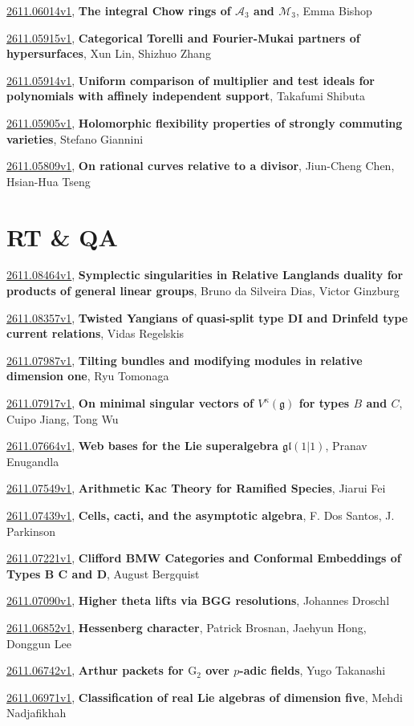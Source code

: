 \documentclass[9pt, a4paper]{article}
\theoremstyle{plain}
\theoremstyle{definition}
\theoremstyle{remark}
\newcommand{\arxiv}[3]{\href{https://arxiv.org/abs/#1}{#1}, \textbf{\textcolor{arxivblue}{#2}}, #3}
\begin{document}
\arxiv{2611.06014v1}{The integral Chow rings of $\mathcal A_3$ and $\mathcal M_3$}{Emma Bishop}

\arxiv{2611.05915v1}{Categorical Torelli and Fourier-Mukai partners of hypersurfaces}{Xun Lin, Shizhuo Zhang}

\arxiv{2611.05914v1}{Uniform comparison of multiplier and test ideals for polynomials with affinely independent support}{Takafumi Shibuta}

\arxiv{2611.05905v1}{Holomorphic flexibility properties of strongly commuting varieties}{Stefano Giannini}

\arxiv{2611.05809v1}{On rational curves relative to a divisor}{Jiun-Cheng Chen, Hsian-Hua Tseng}


\section{RT \& QA}
\arxiv{2611.08464v1}{Symplectic singularities in Relative Langlands duality for products of general linear groups}{Bruno da Silveira Dias, Victor Ginzburg}

\arxiv{2611.08357v1}{Twisted Yangians of quasi-split type DI and Drinfeld type current relations}{Vidas Regelskis}

\arxiv{2611.07987v1}{Tilting bundles and modifying modules in relative dimension one}{Ryu Tomonaga}

\arxiv{2611.07917v1}{On minimal singular vectors of $V^κ(\mathfrak{g})$ for types $B$ and $C$}{Cuipo Jiang, Tong Wu}

\arxiv{2611.07664v1}{Web bases for the Lie superalgebra $\mathfrak{gl}(1|1)$}{Pranav Enugandla}

\arxiv{2611.07549v1}{Arithmetic Kac Theory for Ramified Species}{Jiarui Fei}

\arxiv{2611.07439v1}{Cells, cacti, and the asymptotic algebra}{F. Dos Santos, J. Parkinson}

\arxiv{2611.07221v1}{Clifford BMW Categories and Conformal Embeddings of Types B C and D}{August Bergquist}

\arxiv{2611.07090v1}{Higher theta lifts via BGG resolutions}{Johannes Droschl}

\arxiv{2611.06852v1}{Hessenberg character}{Patrick Brosnan, Jaehyun Hong, Donggun Lee}

\arxiv{2611.06742v1}{Arthur packets for $\mathrm{G}_2$ over $p$-adic fields}{Yugo Takanashi}

\arxiv{2611.06971v1}{Classification of real Lie algebras of dimension five}{Mehdi Nadjafikhah}
\end{document}
